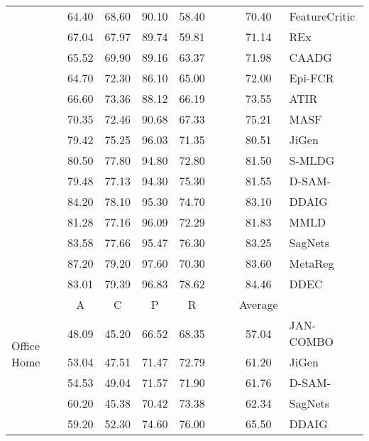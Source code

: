 \documentclass{article}
\begin{document}
\begin{table}
\begin{center}
\begin{small}
{\begin{tabular}{p{1.5cm}cccccccl}
& 64.40 & 68.60 & 90.10 & 58.40 &       &       & 70.40 & FeatureCritic \citep{li2019feature}\\
& 67.04 & 67.97 & 89.74 & 59.81 &       &       & 71.14 & REx \citep{krueger2020out}\\
& 65.52 & 69.90 & 89.16 & 63.37 &       &       & 71.98 & CAADG \citep{rahman2019correlation}\\
& 64.70 & 72.30 & 86.10 & 65.00 &       &       & 72.00 & Epi-FCR \citep{li2019episodic}\\
& 66.60 & 73.36 & 88.12 & 66.19 &       &       & 73.55 & ATIR \citep{albuquerque2019a}\\
& 70.35 & 72.46 & 90.68 & 67.33 &       &       & 75.21 & MASF \citep{dou2019domain}\\
& 79.42 & 75.25 & 96.03 & 71.35 &       &       & 80.51 & JiGen \citep{carlucci2019domain}\\
& 80.50 & 77.80 & 94.80 & 72.80 &       &       & 81.50 & S-MLDG \citep{li2020sequential}\\
& 79.48 & 77.13 & 94.30 & 75.30 &       &       & 81.55 & D-SAM- \citep{d2018domain}\\
& 84.20 & 78.10 & 95.30 & 74.70 &       &       & 83.10 & DDAIG \citep{zhou2020deep}\\
& 81.28 & 77.16 & 96.09 & 72.29 &       &       & 81.83 & MMLD \citep{matsuura2019domain}\\
& 83.58 & 77.66 & 95.47 & 76.30 &       &       & 83.25 & SagNets \citep{nam2019reducing}\\
& 87.20 & 79.20 & 97.60 & 70.30 &       &       & 83.60 & MetaReg \citep{balaji2018metareg}\\
& 83.01 & 79.39 & 96.83 & 78.62 &       &       & 84.46 & DDEC \citep{asadi2019towards}\\
\midrule
\multirow{5}{1.5cm}{Office Home}&     A &     C &     P &     R &       &       & Average & \\
& 48.09 & 45.20 & 66.52 & 68.35 &       &       & 57.04 & JAN-COMBO \citep{rahman2019multi}\\
& 53.04 & 47.51 & 71.47 & 72.79 &       &       & 61.20 & JiGen \citep{carlucci2019domain}\\
& 54.53 & 49.04 & 71.57 & 71.90 &       &       & 61.76 & D-SAM- \citep{d2018domain}\\
& 60.20 & 45.38 & 70.42 & 73.38 &       &       & 62.34 & SagNets \citep{nam2019reducing}\\
& 59.20 & 52.30 & 74.60 & 76.00 &       &       & 65.50 & DDAIG \citep{zhou2020deep}\\
\bottomrule
\end{tabular}
}
\end{small}
\end{center}
\label{table:sota_review}
\end{table}
\end{document}
